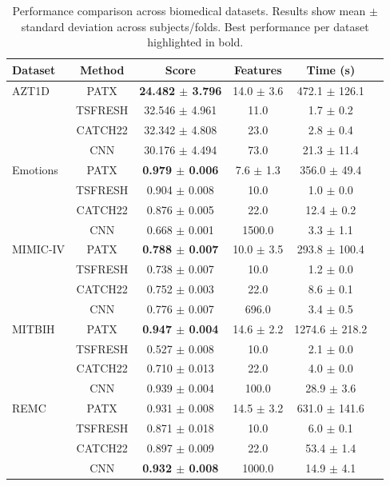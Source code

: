\begin{table}[H]
\centering
\caption{Performance comparison across biomedical datasets. Results show mean $\pm$ standard deviation across subjects/folds. Best performance per dataset highlighted in bold.}
\label{tab:results}
\footnotesize
\begin{tabular*}{\textwidth}{@{\extracolsep{\fill}}lccccc@{}}
\toprule
\textbf{Dataset} & \textbf{Method} & \textbf{Score} & \textbf{Features} & \textbf{Time (s)} \\
\midrule
AZT1D & PATX & \textbf{24.482 $\pm$ 3.796} & 14.0 $\pm$ 3.6 & 472.1 $\pm$ 126.1 \\
 & TSFRESH & 32.546 $\pm$ 4.961 & 11.0 & 1.7 $\pm$ 0.2 \\
 & CATCH22 & 32.342 $\pm$ 4.808 & 23.0 & 2.8 $\pm$ 0.4 \\
 & CNN & 30.176 $\pm$ 4.494 & 73.0 & 21.3 $\pm$ 11.4 \\
\addlinespace
Emotions & PATX & \textbf{0.979 $\pm$ 0.006} & 7.6 $\pm$ 1.3 & 356.0 $\pm$ 49.4 \\
 & TSFRESH & 0.904 $\pm$ 0.008 & 10.0 & 1.0 $\pm$ 0.0 \\
 & CATCH22 & 0.876 $\pm$ 0.005 & 22.0 & 12.4 $\pm$ 0.2 \\
 & CNN & 0.668 $\pm$ 0.001 & 1500.0 & 3.3 $\pm$ 1.1 \\
\addlinespace
MIMIC-IV & PATX & \textbf{0.788 $\pm$ 0.007} & 10.0 $\pm$ 3.5 & 293.8 $\pm$ 100.4 \\
 & TSFRESH & 0.738 $\pm$ 0.007 & 10.0 & 1.2 $\pm$ 0.0 \\
 & CATCH22 & 0.752 $\pm$ 0.003 & 22.0 & 8.6 $\pm$ 0.1 \\
 & CNN & 0.776 $\pm$ 0.007 & 696.0 & 3.4 $\pm$ 0.5 \\
\addlinespace
MITBIH & PATX & \textbf{0.947 $\pm$ 0.004} & 14.6 $\pm$ 2.2 & 1274.6 $\pm$ 218.2 \\
 & TSFRESH & 0.527 $\pm$ 0.008 & 10.0 & 2.1 $\pm$ 0.0 \\
 & CATCH22 & 0.710 $\pm$ 0.013 & 22.0 & 4.0 $\pm$ 0.0 \\
 & CNN & 0.939 $\pm$ 0.004 & 100.0 & 28.9 $\pm$ 3.6 \\
\addlinespace
REMC & PATX & 0.931 $\pm$ 0.008 & 14.5 $\pm$ 3.2 & 631.0 $\pm$ 141.6 \\
 & TSFRESH & 0.871 $\pm$ 0.018 & 10.0 & 6.0 $\pm$ 0.1 \\
 & CATCH22 & 0.897 $\pm$ 0.009 & 22.0 & 53.4 $\pm$ 1.4 \\
 & CNN & \textbf{0.932 $\pm$ 0.008} & 1000.0 & 14.9 $\pm$ 4.1 \\

\end{tabular*}
\end{table}

